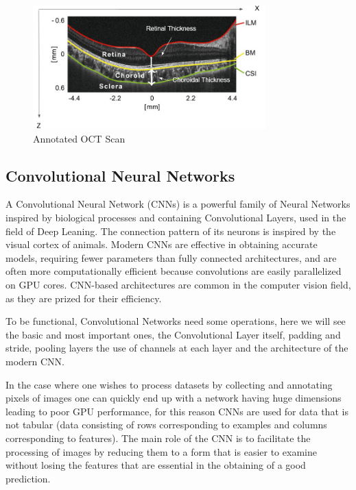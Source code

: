 \documentclass[12pt,a4paper]{scrartcl}
\begin{document}
\begin{figure}[H]
    \centering
    \includegraphics[width=0.8\textwidth]{./images/OCT-Scan.png}
    \caption{Annotated OCT Scan \cite{ronchetti2019}}
    \label{fig:annotated-oct-scan}
\end{figure}

\subsection{Convolutional Neural Networks}

A Convolutional Neural Network (CNNs) is a powerful family of Neural Networks inspired by biological processes and containing Convolutional Layers, used in the field of Deep Leaning. The connection pattern of its neurons is inspired by the visual cortex of animals. Modern CNNs are effective in obtaining accurate models, requiring fewer parameters than fully connected architectures, and are often more computationally efficient because convolutions are easily parallelized on GPU cores.\cite{DIDLBook} CNN-based architectures are common in the computer vision field, as they are prized for their efficiency. 

To be functional, Convolutional Networks need some operations, here we will see the basic and most important ones, the Convolutional Layer itself, padding and stride, pooling layers the use of channels at each layer and the architecture of the modern CNN.

In the case where one wishes to process datasets by collecting and annotating pixels of images one can quickly end up with a network having huge dimensions leading to poor GPU performance, for this reason CNNs are used for data that is not tabular (data consisting of rows corresponding to examples and columns corresponding to features).\cite{DIDLBook} The main role of the CNN is to facilitate the processing of images by reducing them to a form that is easier to examine without losing the features that are essential in the obtaining of a good prediction.
\end{document}
